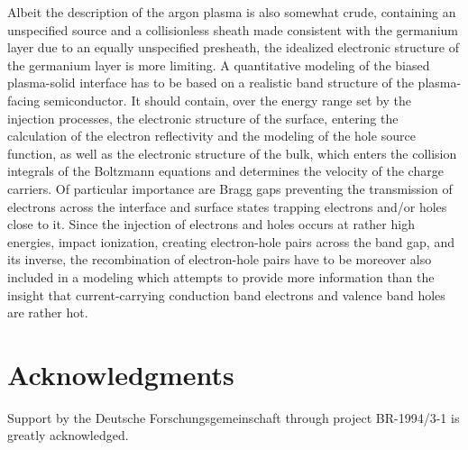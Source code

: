 \documentclass[pre,reprint,floats]{revtex4-1}
\begin{document}
Albeit the description of the argon plasma is also somewhat crude, containing an unspecified 
source and a collisionless sheath made consistent with the germanium layer due to an equally 
unspecified presheath, the idealized electronic structure of the germanium layer is more 
limiting. A quantitative modeling of the biased plasma-solid interface has to be based on a 
realistic band structure of the plasma-facing semiconductor. It should contain, over the energy 
range set by the injection processes, the electronic structure of the surface, entering the 
calculation of the electron reflectivity and the modeling of the hole source function, as well 
as the electronic structure of the bulk, which enters the collision integrals of the Boltzmann 
equations and determines the velocity of the charge carriers. Of particular importance are Bragg 
gaps preventing the transmission of electrons across the interface and surface states trapping 
electrons and/or holes close to it. Since the injection of electrons and holes occurs at rather 
high energies, impact ionization, creating electron-hole pairs across the band gap, and its inverse, 
the recombination of electron-hole pairs have to be moreover also included in a modeling which 
attempts to provide more information than the insight that current-carrying conduction band 
electrons and valence band holes are rather hot. 

\section*{Acknowledgments}
Support by the Deutsche Forschungsgemeinschaft through project BR-1994/3-1 is greatly acknowledged.


\end{document}
